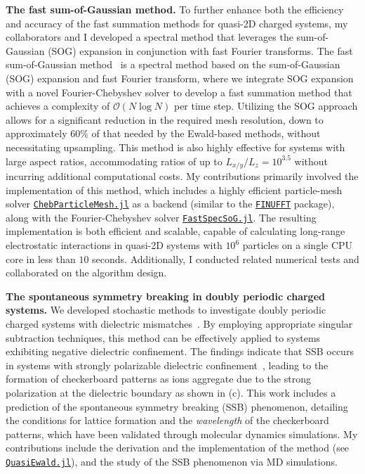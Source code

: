 \textbf{The fast sum-of-Gaussian method.}
To further enhance both the efficiency and accuracy of the fast summation methods for quasi-2D charged systems, my collaborators and I developed a spectral method that leverages the sum-of-Gaussian (SOG) expansion in conjunction with fast Fourier transforms.
The fast sum-of-Gaussian method~\cite{fssog} is a spectral method based on the sum-of-Gaussian (SOG) expansion and fast Fourier transform, where we integrate SOG expansion with a novel Fourier-Chebyshev solver to develop a fast summation method that achieves a complexity of $\mathcal{O}(N \log N)$ per time step.
Utilizing the SOG approach allows for a significant reduction in the required mesh resolution, down to approximately $60\%$ of that needed by the Ewald-based methods, without necessitating upsampling. 
This method is also highly effective for systems with large aspect ratios, accommodating ratios of up to $L_{x/y} / L_z = 10^{3.5}$ without incurring additional computational costs. 
My contributions primarily involved the implementation of this method, which includes a highly efficient particle-mesh solver \href{https://github.com/HPMolSim/ChebParticleMesh.jl}{\texttt{ChebParticleMesh.jl}} as a backend (similar to the \href{https://finufft.readthedocs.io/en/latest/}{\texttt{FINUFFT}} package), along with the Fourier-Chebyshev solver \href{https://github.com/HPMolSim/FastSpecSoG.jl}{\texttt{FastSpecSoG.jl}}. 
The resulting implementation is both efficient and scalable, capable of calculating long-range electrostatic interactions in quasi-2D systems with $10^6$ particles on a single CPU core in less than $10$ seconds.
Additionally, I conducted related numerical tests and collaborated on the algorithm design.

\textbf{The spontaneous symmetry breaking in doubly periodic charged systems.}
We developed stochastic methods to investigate doubly periodic charged systems with dielectric mismatches~\cite{quasiewald, gan2024random}. 
By employing appropriate singular subtraction techniques, this method can be effectively applied to systems exhibiting negative dielectric confinement. 
The findings indicate that SSB occurs in systems with strongly polarizable dielectric confinement~\cite{gao2024broken}, leading to the formation of checkerboard patterns as ions aggregate due to the strong polarization at the dielectric boundary as shown in  (c).
This work includes a prediction of the spontaneous symmetry breaking (SSB) phenomenon, detailing the conditions for lattice formation and the \textit{wavelength} of the checkerboard patterns, which have been validated through molecular dynamics simulations.
My contributions include the derivation and the implementation of the method (see \href{https://github.com/HPMolSim/QuasiEwald.jl}{\texttt{QuasiEwald.jl}}), and the study of the SSB phenomenon via MD simulations.

